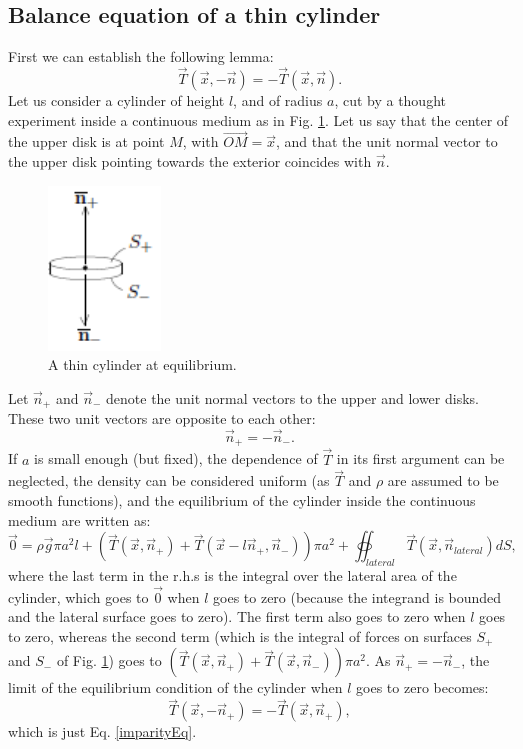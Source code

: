\documentclass[DIV=12]{article}
\newcommand{\intSurf}{\oiint}
\begin{document}
\subsection{Balance equation of a thin cylinder}
First we can establish the following lemma:
\begin{equation}
\vec{T}( \vec{x},-\vec{n} ) = -\vec{T}( \vec{x},\vec{n} ).
 \label{imparityEq}
 \end{equation}
Let us consider a cylinder of height $l$, and of radius $a$, cut by a thought experiment
 inside a continuous medium  
 as in Fig. \ref{cylinder}. Let us say that the 
 center of the upper disk is at point $M$, with $\overrightarrow{OM} = \vec{x}$,
 and that the unit normal vector to the upper disk pointing towards the exterior coincides with $\vec{n}$.
\begin{figure}
\centering
  \includegraphics[width=30mm]{cylinder.png}
 \caption{A thin cylinder at equilibrium.}
\label{cylinder}
\end{figure}
 Let $\vec{n}_+$ and $\vec{n}_-$ denote the unit normal vectors
 to the upper and lower disks. These two unit vectors are opposite to each other:
 \begin{equation}
 \vec{n}_+ = -\vec{n}_-.
 \end{equation}
 If $a$ is small enough (but fixed), the dependence of $\vec{T}$ in 
 its first argument can be neglected, the density can be considered uniform (as $\vec{T}$ and $\rho$ are 
 assumed to be smooth functions), and the 
 equilibrium of the cylinder inside the continuous medium are written as:
\begin{equation}
 \vec{0}= \rho\vec{g} \pi a^2 l + \left( \vec{T}( \vec{x}, \vec{n}_+) + \vec{T}( \vec{x} - l \vec{n}_+, \vec{n}_-) \right) \pi a^2  + \intSurf_{lateral} \vec{T}( \vec{x},  \vec{n}_{lateral}) dS,
\end{equation}
 where the last term in the r.h.s  is the integral over the lateral area of the cylinder, which goes to $\vec{0}$ when $l$ goes to zero (because the integrand is bounded 
 and the lateral surface goes to zero). The first term also goes to zero when $l$ goes to zero, whereas the second term (which is the integral of 
 forces on surfaces $S_+$ and $S_-$ of Fig. \ref{cylinder}) 
  goes to  $\left( \vec{T}( \vec{x}, \vec{n}_+) + \vec{T}( \vec{x},  \vec{n}_-) \right) \pi a^2$.  As $\vec{n}_+ = -\vec{n}_-$, the limit of 
 the equilibrium condition of the cylinder when $l$ goes to zero becomes:
 \begin{equation}
\vec{T}( \vec{x},-\vec{n}_+) = -\vec{T}( \vec{x},\vec{n}_+ ),
 \end{equation}
  which is just Eq. \ref{imparityEq}. 
\end{document}

